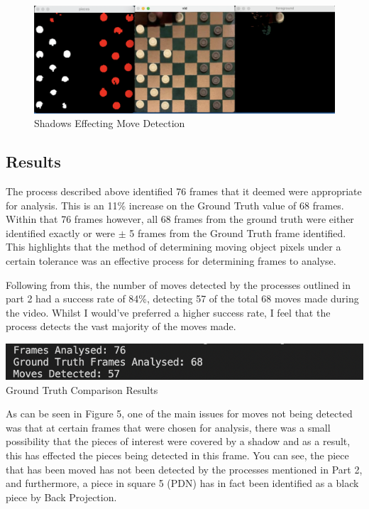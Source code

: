 \documentclass[11pt]{article}
\begin{document}
    \newpage

    \begin{figure}
        \centering
        \includegraphics[scale=0.3]{Shadow-Covering-Pieces.png}
        \caption{Shadows Effecting Move Detection}
    \end{figure}

    \subsection{Results}
    \par
    The process described above identified 76 frames that it deemed were appropriate for analysis. This is an 11\% increase on the Ground Truth value of 68 frames. Within that 76 frames however, all 68 frames from the ground truth were either identified exactly or were 
    \(\pm\) 5 frames from the Ground Truth frame identified. This highlights that the method of determining moving object pixels under a certain tolerance was an effective process for determining frames to analyse.
    \par
    Following from this, the number of moves detected by the processes outlined in part 2 had a success rate of 84\%, detecting 57 of the total 68 moves made during the video. Whilst I would've preferred a higher success rate, I feel that 
    the process detects the vast majority of the moves made.
    \begin{center}
        \includegraphics[scale=1]{AssignPt3Res.png}
        Ground Truth Comparison Results
    \end{center}
    \par
    As can be seen in Figure 5, one of the main issues for moves not being detected was that at certain frames that were chosen for analysis, there was a small possibility that the pieces of interest were covered by a shadow
    and as a result, this has effected the pieces being detected in this frame. You can see, the piece that has been moved has not been detected by the processes mentioned in Part 2, and furthermore, a piece in square 5 (PDN) 
    has in fact been identified as a black piece by Back Projection.
    
\end{document}

